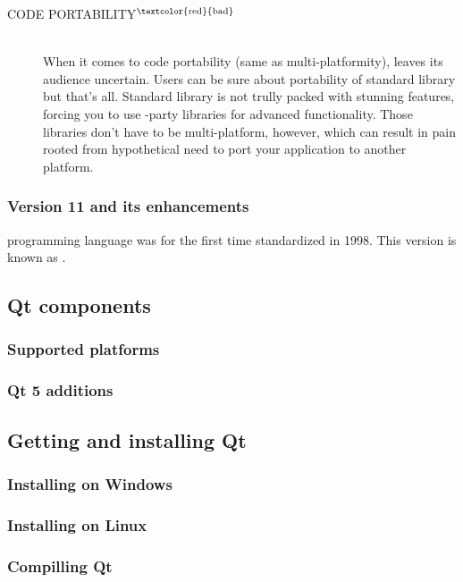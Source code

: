 \begin{description}
\item[CODE PORTABILITY$^{\text{\textcolor{red}{bad}}}$]\hfill \\
When it comes to code portability (same as multi-platformity), \cpp leaves its audience uncertain. Users can be sure about portability of \cpp standard library but that's all. Standard library is not trully packed with stunning features, forcing you to use -party libraries for advanced functionality. Those libraries don't have to be multi-platform, however, which can result in pain rooted from hypothetical need to port your application to another platform.
\end{description}

\subsubsection{Version 11 and its enhancements}
\cpp programming language was for the first time standardized in 1998. This version is known as . 

\subsection{Qt components}

\subsubsection{Supported platforms}

\subsubsection{Qt 5 additions}

\subsection{Getting and installing Qt}

\subsubsection{Installing on Windows}

\subsubsection{Installing on Linux}

\subsubsection{Compilling Qt}